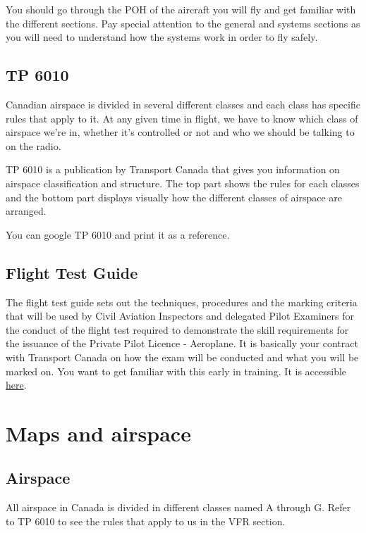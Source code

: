 \documentclass[12pt,letterpaper]{article}
\begin{document}
        You should go through the POH of the aircraft you will fly and get familiar with the different sections. Pay special attention to the general and systems sections as you will need to understand how the systems work in order to fly safely.
        
        \subsection{TP 6010}
        
        Canadian airspace is divided in several different classes and each class has specific rules that apply to it. At any given time in flight, we have to know which class of airspace we're in, whether it's controlled or not and who we should be talking to on the radio.
        
        TP 6010 is a publication by Transport Canada that gives you information on airspace classification and structure. The top part shows the rules for each classes and the bottom part displays visually how the different classes of airspace are arranged.
        
        You can google TP 6010 and print it as a reference.
        
        \subsection{Flight Test Guide}
        The flight test guide sets out the techniques, procedures and the marking criteria that will be used by Civil Aviation Inspectors and delegated Pilot Examiners for the conduct of the flight test required to demonstrate the skill requirements for the issuance of the Private Pilot Licence - Aeroplane. It is basically your contract with Transport Canada on how the exam will be conducted and what you will be marked on. You want to get familiar with this early in training. It is accessible \href{https://tc.canada.ca/en/aviation/publications/flight-test-guide-private-pilot-licence-aeroplane-tp-13723}{\color{cyan}here}.
        
    
    \section{Maps and airspace}
        \subsection{Airspace}
        All airspace in Canada is divided in different classes named A through G. Refer to TP 6010 to see the rules that apply to us in the VFR section. 
        
\end{document}

